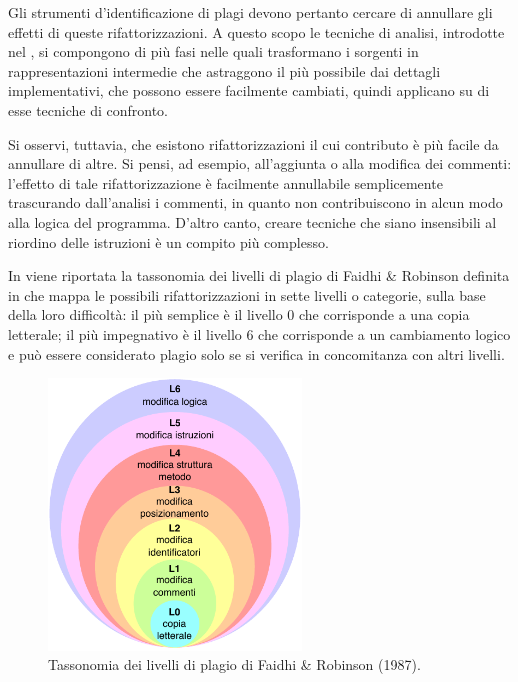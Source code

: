 Gli strumenti d'identificazione di plagi devono pertanto cercare di annullare gli effetti di queste rifattorizzazioni.
%
A questo scopo le tecniche di analisi, introdotte nel , si compongono di più fasi nelle quali trasformano i sorgenti in rappresentazioni intermedie che astraggono il più possibile dai dettagli implementativi, che possono essere facilmente cambiati, quindi applicano su di esse tecniche di confronto.

Si osservi, tuttavia, che esistono rifattorizzazioni il cui contributo è più facile da annullare di altre. 
%
Si pensi, ad esempio, all'aggiunta o alla modifica dei commenti: l'effetto di tale rifattorizzazione è facilmente annullabile semplicemente trascurando dall'analisi i commenti, in quanto non contribuiscono in alcun modo alla logica del programma. 
%
D'altro canto, creare tecniche che siano insensibili al riordino delle istruzioni è un compito più complesso.

In  viene riportata la tassonomia dei livelli di plagio di Faidhi \& Robinson definita in \cite{faidhi-robinson-1987} che mappa le possibili rifattorizzazioni in sette livelli o categorie, sulla base della loro difficoltà: il più semplice è il livello 0 che corrisponde a una copia letterale; il più impegnativo è il livello 6 che corrisponde a un cambiamento logico e può essere considerato plagio solo se si verifica in concomitanza con altri livelli.

\begin{figure}[h]
    \centering
    \includegraphics[width=0.6\textwidth]{resources/img/01-levels-of-plagiarism.pdf}
    \caption{Tassonomia dei livelli di plagio di Faidhi \& Robinson (1987).}
    \label{img:01-levels-of-plagiarism}
\end{figure}

